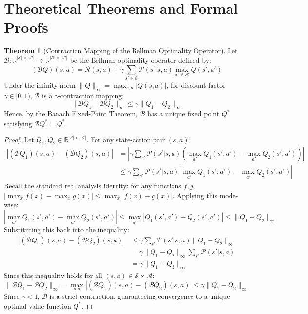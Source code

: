 \documentclass[11pt,a4paper]{article}
\theoremstyle{definition}
\newtheorem{theorem}{\textbf{Theorem}}[section]
\begin{document}
\section{Theoretical Theorems and Formal Proofs}

\begin{theorem}[Contraction Mapping of the Bellman Optimality Operator]
Let $\mathcal{B}: \mathbb{R}^{|\mathcal{S}| \times |\mathcal{A}|} \to \mathbb{R}^{|\mathcal{S}| \times |\mathcal{A}|}$ be the Bellman optimality operator defined by:
{\boldmath
\begin{equation}
(\mathcal{B} Q)(s, a) = \mathcal{R}(s, a) + \gamma \sum_{s' \in \mathcal{S}} \mathcal{P}(s' | s, a) \max_{a' \in \mathcal{A}} Q(s', a')
\end{equation}
}
Under the infinity norm $\|Q\|_\infty = \max_{s, a} |Q(s, a)|$, for discount factor $\gamma \in [0, 1)$, $\mathcal{B}$ is a $\gamma$-contraction mapping:
{\boldmath
\begin{equation}
\|\mathcal{B} Q_1 - \mathcal{B} Q_2\|_\infty \le \gamma \|Q_1 - Q_2\|_\infty
\end{equation}
}
Hence, by the Banach Fixed-Point Theorem, $\mathcal{B}$ has a unique fixed point $Q^*$ satisfying $\mathcal{B} Q^* = Q^*$.
\end{theorem}

\begin{proof}
Let $Q_1, Q_2 \in \mathbb{R}^{|\mathcal{S}| \times |\mathcal{A}|}$. For any state-action pair $(s, a)$:
{\boldmath
\begin{align}
|(\mathcal{B} Q_1)(s, a) - (\mathcal{B} Q_2)(s, a)| &= \left| \gamma \sum_{s'} \mathcal{P}(s' | s, a) \left( \max_{a'} Q_1(s', a') - \max_{a'} Q_2(s', a') \right) \right| \\
&\le \gamma \sum_{s'} \mathcal{P}(s' | s, a) \left| \max_{a'} Q_1(s', a') - \max_{a'} Q_2(s', a') \right|
\end{align}
}
Recall the standard real analysis identity: for any functions $f, g$, $|\max_x f(x) - \max_x g(x)| \le \max_x |f(x) - g(x)|$. Applying this mode-wise:
{\boldmath
\begin{equation}
\left| \max_{a'} Q_1(s', a') - \max_{a'} Q_2(s', a') \right| \le \max_{a'} |Q_1(s', a') - Q_2(s', a')| \le \|Q_1 - Q_2\|_\infty
\end{equation}
}
Substituting this back into the inequality:
{\boldmath
\begin{align}
|(\mathcal{B} Q_1)(s, a) - (\mathcal{B} Q_2)(s, a)| &\le \gamma \sum_{s'} \mathcal{P}(s' | s, a) \|Q_1 - Q_2\|_\infty \\
&= \gamma \|Q_1 - Q_2\|_\infty \sum_{s'} \mathcal{P}(s' | s, a) \\
&= \gamma \|Q_1 - Q_2\|_\infty
\end{align}
}
Since this inequality holds for all $(s, a) \in \mathcal{S} \times \mathcal{A}$:
{\boldmath
\begin{equation}
\|\mathcal{B} Q_1 - \mathcal{B} Q_2\|_\infty = \max_{s, a} |(\mathcal{B} Q_1)(s, a) - (\mathcal{B} Q_2)(s, a)| \le \gamma \|Q_1 - Q_2\|_\infty
\end{equation}
}
Since $\gamma < 1$, $\mathcal{B}$ is a strict contraction, guaranteeing convergence to a unique optimal value function $Q^*$.
\end{proof}
\end{document}
